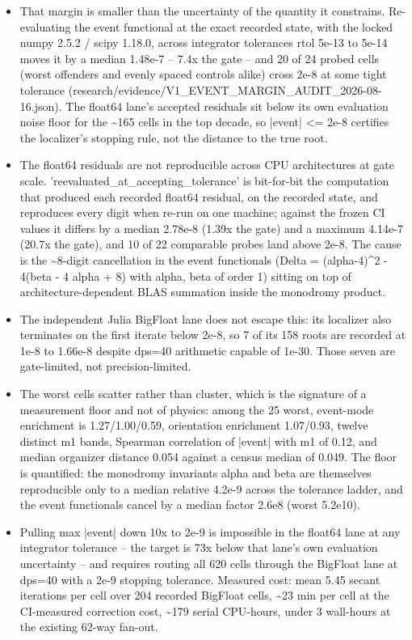 \begin{itemize}
\item That margin is smaller than the uncertainty of the quantity it constrains. Re-evaluating the event functional at the exact recorded state, with the locked numpy 2.5.2 / scipy 1.18.0, across integrator tolerances rtol 5e-13 to 5e-14 moves it by a median 1.48e-7 -- 7.4x the gate -- and 20 of 24 probed cells (worst offenders and evenly spaced controls alike) cross 2e-8 at some tight tolerance (research/evidence/V1\_EVENT\_MARGIN\_AUDIT\_2026-08-16.json). The float64 lane's accepted residuals sit below its own evaluation noise floor for the \textasciitilde{}165 cells in the top decade, so |event| <= 2e-8 certifies the localizer's stopping rule, not the distance to the true root.
\item The float64 residuals are not reproducible across CPU architectures at gate scale. 'reevaluated\_at\_accepting\_tolerance' is bit-for-bit the computation that produced each recorded float64 residual, on the recorded state, and reproduces every digit when re-run on one machine; against the frozen CI values it differs by a median 2.78e-8 (1.39x the gate) and a maximum 4.14e-7 (20.7x the gate), and 10 of 22 comparable probes land above 2e-8. The cause is the \textasciitilde{}8-digit cancellation in the event functionals (Delta = (alpha-4)\^{}2 - 4(beta - 4 alpha + 8) with alpha, beta of order 1) sitting on top of architecture-dependent BLAS summation inside the monodromy product.
\item The independent Julia BigFloat lane does not escape this: its localizer also terminates on the first iterate below 2e-8, so 7 of its 158 roots are recorded at 1e-8 to 1.66e-8 despite dps=40 arithmetic capable of 1e-30. Those seven are gate-limited, not precision-limited.
\item The worst cells scatter rather than cluster, which is the signature of a measurement floor and not of physics: among the 25 worst, event-mode enrichment is 1.27/1.00/0.59, orientation enrichment 1.07/0.93, twelve distinct m1 bands, Spearman correlation of |event| with m1 of 0.12, and median organizer distance 0.054 against a census median of 0.049. The floor is quantified: the monodromy invariants alpha and beta are themselves reproducible only to a median relative 4.2e-9 across the tolerance ladder, and the event functionals cancel by a median factor 2.6e8 (worst 5.2e10).
\item Pulling max |event| down 10x to 2e-9 is impossible in the float64 lane at any integrator tolerance -- the target is 73x below that lane's own evaluation uncertainty -- and requires routing all 620 cells through the BigFloat lane at dps=40 with a 2e-9 stopping tolerance. Measured cost: mean 5.45 secant iterations per cell over 204 recorded BigFloat cells, \textasciitilde{}23 min per cell at the CI-measured correction cost, \textasciitilde{}179 serial CPU-hours, under 3 wall-hours at the existing 62-way fan-out.

\end{itemize}
